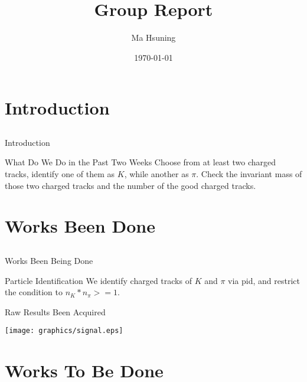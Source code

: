 \documentclass{beamer}
\begin{document}
\title{Group Report}
\subtitle{}
\author{Ma Hsuning}
\date{\today}
\frame{\titlepage}

\section{Introduction}
\subsection{}
\begin{frame}{Introduction}
\begin{itemized}
\item What Do We Do in the Past Two Weeks
\bigskip
Choose from at least two charged tracks, identify one of them as $K$, while another as $\pi$.
Check the invariant mass of those two charged tracks and the number of the good charged tracks.
\end{itemized}
\end{frame}

\section{Works Been Done}
\subsection{}

\begin{frame}{Works Been Being Done}
\begin{itemized}
\item Particle Identification
We identify charged tracks of $K$ and $\pi$ via pid, and restrict the condition to $n_{K} * n_{\pi} >=1$.
\end{itemized}
\end{frame}

\begin{frame}{Raw Results Been Acquired}
   
   \texttt{[image: graphics/signal.eps]}
\end{frame}
\section{Works To Be Done}
\end{document}
